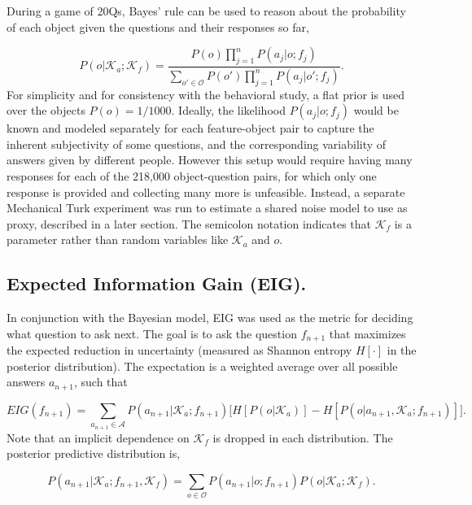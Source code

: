\documentclass[11pt,letterpaper]{article}
\newcommand{\mc}[1]{\mathcal{#1}}
\begin{document}
During a game of 20Qs, Bayes' rule can be used to reason about the probability of each object given the questions and their responses so far,

\begin{equation} \label{bayes}
P(o|\mc{K}_a; \mc{K}_f) 
= \frac{ P(o) \prod_{j=1}^{n}  P(a_j | o; f_j) }{\sum_{o' \in \mc{O}} P(o') \prod_{j=1}^{n} P(a_j | o'; f_j) }.
\end{equation}
For simplicity and for consistency with the behavioral study, a flat prior is used over the objects $P(o) = 1/1000$. 
Ideally, the likelihood $P(a_j | o; f_j)$ would be known and modeled separately for each feature-object pair to capture the inherent subjectivity of some questions, and the corresponding variability of answers given by different people. 
However this setup would require having many responses for each of the 218,000 object-question pairs, for which only one response is provided and collecting many more is unfeasible. 
Instead, a separate Mechanical Turk experiment was run to estimate a shared noise model to use as proxy, described in a later section. 
The semicolon notation indicates that $\mc{K}_f$ is a parameter rather than random variables like $\mc{K}_a$ and $o$.

\subsection*{Expected Information Gain (EIG).}
In conjunction with the Bayesian model, EIG was used as the metric for deciding what question to ask next. 
The goal is to ask the question $f_{n+1}$ that maximizes the expected reduction in uncertainty (measured as Shannon entropy $H[\cdot]$ in the posterior distribution). 
The expectation is a weighted average over all possible answers $a_{n+1}$, such that


\begin{equation} \label{eig}
EIG(f_{n+1}) = 
\sum_{a_{n+1} \in \mc{A}} P(a_{n+1}|\mc{K}_a; f_{n+1}) \Big[ H[P(o|\mc{K}_a)] - H[P(o|a_{n+1},\mc{K}_a; f_{n+1})] \Big].
\end{equation}
Note that an implicit dependence on $\mc{K}_f$ is dropped in each distribution. The posterior predictive distribution is,

\begin{equation} \label{post_predict}
P(a_{n+1}| \mc{K}_a; f_{n+1}, \mc{K}_f) = \sum_{o \in \mc{O}} P(a_{n+1} | o; f_{n+1}) P(o|\mc{K}_a; \mc{K}_f).
\end{equation}
\end{document}
